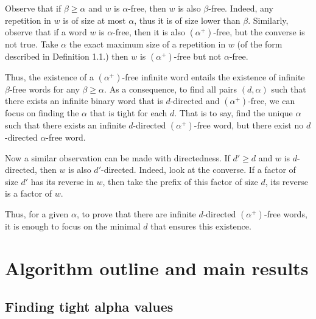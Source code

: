 \documentclass[a4paper]{article}
\theoremstyle{definition}
\begin{document}
Observe that if $\beta \ge \alpha$ and $w$ is $\alpha$-free, then $w$ is also $\beta$-free. Indeed, any repetition in $w$ is of size at most $\alpha$, thus it is of size lower than $\beta$. Similarly, observe that if a word $w$ is $\alpha$-free, then it is also $(\alpha^+)$-free, but the converse is not true. Take $\alpha$ the exact maximum size of a repetition in $w$ (of the form described in Definition 1.1.) then $w$ is $(\alpha^+)$-free but not $\alpha$-free.

Thus, the existence of a $(\alpha^+)$-free infinite word entails the existence of infinite $\beta$-free words for any $\beta \ge \alpha$. As a consequence, to find all pairs $(d, \alpha)$ such that there exists an infinite binary word that is $d$-directed and $(\alpha^+)$-free, we can focus on finding the $\alpha$ that is tight for each $d$. That is to say, find the unique $\alpha$ such that there exists an infinite $d$-directed $(\alpha^+)$-free word, but there exist no $d$-directed $\alpha$-free word.

Now a similar observation can be made with directedness. If $d' \ge d$ and $w$ is $d$-directed, then $w$ is also $d'$-directed. Indeed, look at the converse. If a factor of size $d'$ has its reverse in $w$, then take the prefix of this factor of size $d$, its reverse is a factor of $w$.

Thus, for a given $\alpha$, to prove that there are infinite $d$-directed $(\alpha^+)$-free words, it is enough to focus on the minimal $d$ that ensures this existence.



\section{Algorithm outline and main results}

\subsection{Finding tight alpha values}
\label{alpha}
\end{document}
